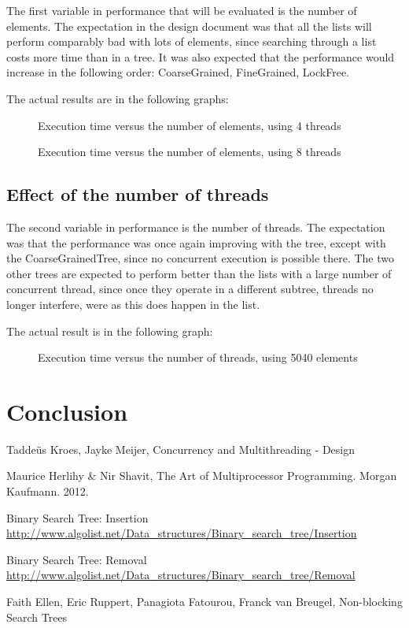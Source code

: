 \documentclass[a4paper]{article}
\begin{document}
The first variable in performance that will be evaluated is the number of elements. The
expectation in the design document was that all the lists will perform comparably bad with
lots of elements, since searching through a list costs more time than in a tree. It was 
also expected that the performance would increase in the following order: CoarseGrained,
FineGrained, LockFree.

The actual results are in the following graphs:
\begin{figure}
    \caption{Execution time versus the number of elements, using 4 threads}
    \label{elem_4thread}
\end{figure}
\begin{figure}
    \caption{Execution time versus the number of elements, using 8 threads}
    \label{elem_8thread}
\end{figure}

\subsection{Effect of the number of threads}

The second variable in performance is the number of threads. The expectation was that the
performance was once again improving with the tree, except with the CoarseGrainedTree, 
since no concurrent execution is possible there. The two other trees are expected to
perform better than the lists with a large number of concurrent thread, since once they
operate in a different subtree, threads no longer interfere, were as this does happen in
the list.

The actual result is in the following graph:
\begin{figure}
    \caption{Execution time versus the number of threads, using 5040 elements}
    \label{thread}
\end{figure}

\section{Conclusion}

\begin{thebibliography}{}    
    Taddeüs Kroes, Jayke Meijer, Concurrency and Multithreading - Design

    Maurice Herlihy \& Nir Shavit, The Art of Multiprocessor Programming. Morgan Kaufmann.         
    2012.

    Binary Search Tree: Insertion
    \url{http://www.algolist.net/Data_structures/Binary_search_tree/Insertion}
    
    Binary Search Tree: Removal
    \url{http://www.algolist.net/Data_structures/Binary_search_tree/Removal}

    Faith Ellen, Eric Ruppert, Panagiota Fatourou, Franck van Breugel, Non-blocking Search 
    Trees

\end{thebibliography}
\end{document}
